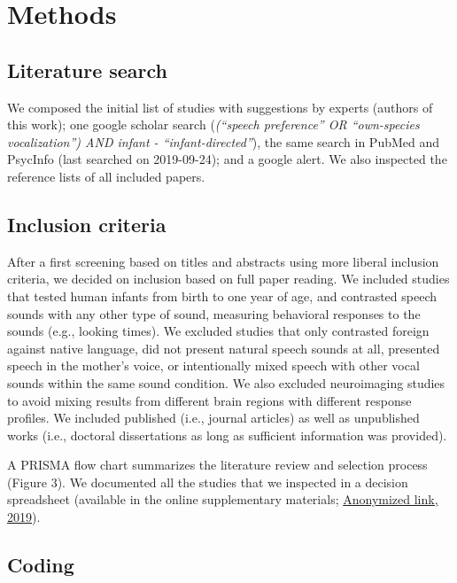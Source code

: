 \documentclass[man,floatsintext]{apa6}
\begin{document}
\hypertarget{methods}{%
\section{Methods}\label{methods}}

\hypertarget{literature-search}{%
\subsection{Literature search}\label{literature-search}}

We composed the initial list of studies with suggestions by experts (authors of this work); one google scholar search (\emph{(\enquote{speech preference} OR \enquote{own-species vocalization}) AND infant - \enquote{infant-directed}}), the same search in PubMed and PsycInfo (last searched on 2019-09-24); and a google alert. We also inspected the reference lists of all included papers.

\hypertarget{inclusion-criteria}{%
\subsection{Inclusion criteria}\label{inclusion-criteria}}

After a first screening based on titles and abstracts using more liberal inclusion criteria, we decided on inclusion based on full paper reading. We included studies that tested human infants from birth to one year of age, and contrasted speech sounds with any other type of sound, measuring behavioral responses to the sounds (e.g., looking times). We excluded studies that only contrasted foreign against native language, did not present natural speech sounds at all, presented speech in the mother's voice, or intentionally mixed speech with other vocal sounds within the same sound condition. We also excluded neuroimaging studies to avoid mixing results from different brain regions with different response profiles. We included published (i.e., journal articles) as well as unpublished works (i.e., doctoral dissertations as long as sufficient information was provided).

A PRISMA flow chart summarizes the literature review and selection process (Figure 3). We documented all the studies that we inspected in a decision spreadsheet (available in the online supplementary materials; \href{https://osf.io/4stz9/?view_only=d0696591ebf34bfc8430f848cd945ca8}{Anonymized link, 2019}).

\hypertarget{coding}{%
\subsection{Coding}\label{coding}}
\end{document}
